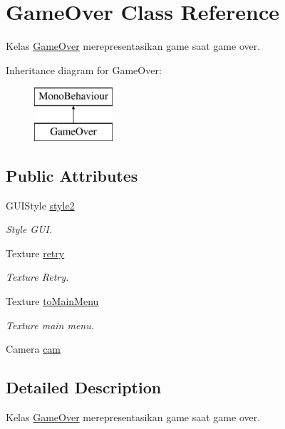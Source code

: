 \hypertarget{class_game_over}{}\section{Game\+Over Class Reference}
\label{class_game_over}


Kelas \hyperlink{class_game_over}{Game\+Over} merepresentasikan game saat game over.  


Inheritance diagram for Game\+Over\+:\begin{figure}[H]
\begin{center}
\leavevmode
\includegraphics[height=2.000000cm]{class_game_over}
\end{center}
\end{figure}
\subsection*{Public Attributes}
\begin{DoxyCompactItemize}
\item 
G\+U\+I\+Style \hyperlink{class_game_over_a71e12fb4df1725763589943e10d7d9ec}{style2}
\begin{DoxyCompactList}\small\item\em Style G\+UI. \end{DoxyCompactList}\item 
Texture \hyperlink{class_game_over_ace41c3a08ba092a634f4b4b92c358e12}{retry}
\begin{DoxyCompactList}\small\item\em Texture Retry. \end{DoxyCompactList}\item 
Texture \hyperlink{class_game_over_aeffb99ea771f8eb04e5fe5c4c7dc71b2}{to\+Main\+Menu}
\begin{DoxyCompactList}\small\item\em Texture main menu. \end{DoxyCompactList}\item 
Camera \hyperlink{class_game_over_a899a798fa536c25b7c9781ee8c3ab9fd}{cam}
\end{DoxyCompactItemize}


\subsection{Detailed Description}
Kelas \hyperlink{class_game_over}{Game\+Over} merepresentasikan game saat game over. 



